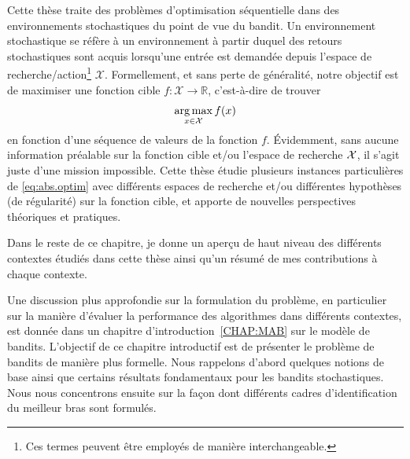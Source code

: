 Cette thèse traite des problèmes d'optimisation séquentielle dans des environnements stochastiques du point de vue du bandit. Un environnement stochastique se réfère à un environnement à partir duquel des retours stochastiques sont acquis lorsqu'une entrée est demandée depuis l'espace de recherche/action\footnote{Ces termes peuvent être employés de manière interchangeable.} $\mathcal{X}$. Formellement, et sans perte de généralité, notre objectif est de maximiser une fonction cible $f:\mathcal{X}\rightarrow\mathbb{R}$, c'est-à-dire de trouver 
\begin{equation}\label{eq:abs.optim}
    \operatorname*{arg\,max}_{x\in\mathcal{X}} f(x)
\end{equation}
en fonction d'une séquence de valeurs de la fonction $f$. Évidemment, sans aucune information préalable sur la fonction cible et/ou l'espace de recherche $\mathcal{X}$, il s'agit juste d'une mission impossible. Cette thèse étudie plusieurs instances particulières de \eqref{eq:abs.optim} avec différents espaces de recherche et/ou différentes hypothèses (de régularité) sur la fonction cible, et apporte de nouvelles perspectives théoriques et pratiques. 

Dans le reste de ce chapitre, je donne un aperçu de haut niveau des différents contextes étudiés dans cette thèse ainsi qu'un résumé de mes contributions à chaque contexte.

Une discussion plus approfondie sur la formulation du problème, en particulier sur la manière d'évaluer la performance des algorithmes dans différents contextes, est donnée dans un chapitre d'introduction~\ref{CHAP:MAB} sur le modèle de bandits. L'objectif de ce chapitre introductif est de présenter le problème de bandits de manière plus formelle. Nous rappelons d'abord quelques notions de base ainsi que certains résultats fondamentaux pour les bandits stochastiques. Nous nous concentrons ensuite sur la façon dont différents cadres d'identification du meilleur bras sont formulés.


